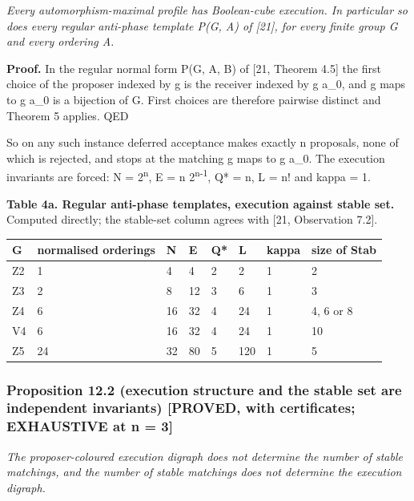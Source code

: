 \documentclass[
  11pt,
]{article}
\begin{document}
\emph{Every automorphism-maximal profile has Boolean-cube execution. In
particular so does every regular anti-phase template P(G, A) of
{[}21{]}, for every finite group G and every ordering A.}

\textbf{Proof.} In the regular normal form P(G, A, B) of {[}21, Theorem
4.5{]} the first choice of the proposer indexed by g is the receiver
indexed by g a\_0, and g maps to g a\_0 is a bijection of G. First
choices are therefore pairwise distinct and Theorem 5 applies. QED

So on any such instance deferred acceptance makes exactly n proposals,
none of which is rejected, and stops at the matching g maps to g a\_0.
The execution invariants are forced: N = 2\textsuperscript{n}, E = n
2\textsuperscript{n-1}, Q* = n, L = n! and kappa = 1.

\textbf{Table 4a. Regular anti-phase templates, execution against stable
set.} Computed directly; the stable-set column agrees with {[}21,
Observation 7.2{]}.

\begin{longtable}[]{@{}llllllll@{}}
\toprule\noalign{}
G & normalised orderings & N & E & Q* & L & kappa & size of Stab \\
\midrule\noalign{}
\endhead
\bottomrule\noalign{}
\endlastfoot
Z2 & 1 & 4 & 4 & 2 & 2 & 1 & 2 \\
Z3 & 2 & 8 & 12 & 3 & 6 & 1 & 3 \\
Z4 & 6 & 16 & 32 & 4 & 24 & 1 & 4, 6 or 8 \\
V4 & 6 & 16 & 32 & 4 & 24 & 1 & 10 \\
Z5 & 24 & 32 & 80 & 5 & 120 & 1 & 5 \\
\end{longtable}

\hypertarget{proposition-12.2-execution-structure-and-the-stable-set-are-independent-invariants-proved-with-certificates-exhaustive-at-n-3}{%
\subsubsection{Proposition 12.2 (execution structure and the stable set
are independent invariants) {[}PROVED, with certificates; EXHAUSTIVE at
n =
3{]}}\label{proposition-12.2-execution-structure-and-the-stable-set-are-independent-invariants-proved-with-certificates-exhaustive-at-n-3}}

\emph{The proposer-coloured execution digraph does not determine the
number of stable matchings, and the number of stable matchings does not
determine the execution digraph.}
\end{document}
